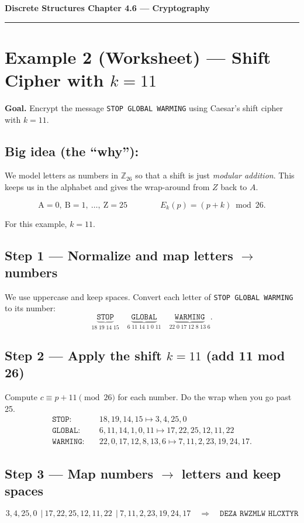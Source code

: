 \documentclass[12pt]{article}
\begin{document}
{\large \textbf{Discrete Structures \quad Chapter 4.6 — Cryptography}}

\hrule
\vspace{0.6em}

\section*{Example 2 (Worksheet) — Shift Cipher with \(k=11\)}

\textbf{Goal.} Encrypt the message \texttt{STOP GLOBAL WARMING} using Caesar's shift cipher with \(k=11\).

\subsection*{Big idea (the ``why''):}%
We model letters as numbers in \(\mathbb{Z}_{26}\) so that a shift is just \emph{modular addition}. This keeps us in the alphabet and gives the wrap-around from \(Z\) back to \(A\).

\[
\text{A}=0,\ \text{B}=1,\ \ldots,\ \text{Z}=25
\qquad\qquad
E_k(p) = (p + k) \bmod 26.
\]

For this example, \(k=11\).

\subsection*{Step 1 — Normalize and map letters \(\to\) numbers}
We use uppercase and keep spaces. Convert each letter of \texttt{STOP GLOBAL WARMING} to its number:
\[
\underbrace{\texttt{STOP}}_{18\;19\;14\;15}
\quad
\underbrace{\texttt{GLOBAL}}_{6\;11\;14\;1\;0\;11}
\quad
\underbrace{\texttt{WARMING}}_{22\;0\;17\;12\;8\;13\;6}.
\]

\subsection*{Step 2 — Apply the shift \(k=11\) (add 11 mod 26)}
Compute \(c \equiv p+11 \pmod{26}\) for each number. Do the wrap when you go past 25.
\[
\begin{aligned}
\texttt{STOP}:&\quad 18,19,14,15 \mapsto 3,4,25,0 \\
\texttt{GLOBAL}:&\quad 6,11,14,1,0,11 \mapsto 17,22,25,12,11,22 \\
\texttt{WARMING}:&\quad 22,0,17,12,8,13,6 \mapsto 7,11,2,23,19,24,17.
\end{aligned}
\]

\subsection*{Step 3 — Map numbers \(\to\) letters and keep spaces}
\[
3,4,25,0\ \ |\ 17,22,25,12,11,22\ \ |\ 7,11,2,23,19,24,17
\quad\Rightarrow\quad
\boxed{\texttt{DEZA RWZMLW HLCXTYR}}
\]
\end{document}
